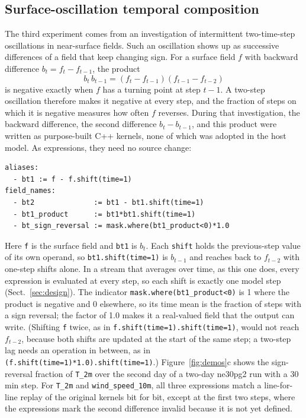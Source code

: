 \documentclass[gmd, manuscript]{copernicus}
\newcommand{\bk}{\discretionary{}{}{}}
\begin{document}
\subsection{Surface-oscillation temporal composition}
\label{sec:oscillation}

The third experiment comes from an investigation of intermittent two-time-step oscillations in near-surface fields. Such an oscillation shows up as successive differences of a field that keep changing sign. For a surface field $f$ with backward difference $b_t = f_t - f_{t-1}$, the product
\begin{equation}
  b_t\,b_{t-1} = (f_t - f_{t-1})(f_{t-1} - f_{t-2})
  \label{eq:oscillation}
\end{equation}
is negative exactly when $f$ has a turning point at step $t-1$. A two-step oscillation therefore makes it negative at every step, and the fraction of steps on which it is negative measures how often $f$ reverses. During that investigation, the backward difference, the second difference $b_t-b_{t-1}$, and this product were written as purpose-built C++ kernels, none of which was adopted in the host model. As expressions, they need no source change:
\begin{verbatim}
aliases:
  - bt1 := f - f.shift(time=1)
field_names:
  - bt2              := bt1 - bt1.shift(time=1)
  - bt1_product      := bt1*bt1.shift(time=1)
  - bt_sign_reversal := mask.where(bt1_product<0)*1.0
\end{verbatim}
Here \texttt{f} is the surface field and \texttt{bt1} is $b_t$. Each \texttt{shift} holds the previous-step value of its own operand, so \texttt{bt1.\bk shift(time=1)} is $b_{t-1}$ and reaches back to $f_{t-2}$ with one-step shifts alone. In a stream that averages over time, as this one does, every expression is evaluated at every step, so each shift is exactly one model step (Sect.~\ref{sec:design}). The indicator \texttt{mask.\bk where(bt1\_product<0)} is 1 where the product is negative and 0 elsewhere, so its time mean is the fraction of steps with a sign reversal; the factor of 1.0 makes it a real-valued field that the output can write. (Shifting \texttt{f} twice, as in \texttt{f.shift(time=1).\bk shift(time=1)}, would not reach $f_{t-2}$, because both shifts are updated at the start of the same step; a two-step lag needs an operation in between, as in \texttt{(f.shift(time=1)*1.0).\bk shift(time=1)}.) Figure~\ref{fig:demos}c shows the sign-reversal fraction of \texttt{T\_2m} over the second day of a two-day ne30pg2 run with a 30\,min step. For \texttt{T\_2m} and \texttt{wind\_speed\_10m}, all three expressions match a line-for-line replay of the original kernels bit for bit, except at the first two steps, where the expressions mark the second difference invalid because it is not yet defined.
\end{document}
